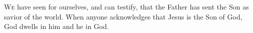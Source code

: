 
\lettrine{W}{e} have seen for ourselves, and can testify,
that the Father has sent the Son as savior of the world.
When anyone acknowledges that Jesus is the Son of God,
God dwells in him
and he in God.